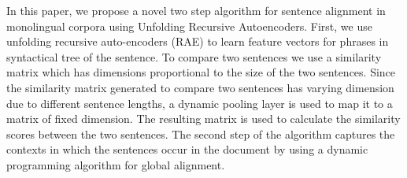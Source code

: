 In this paper, we propose a novel two step algorithm for sentence alignment in monolingual corpora using Unfolding Recursive Autoencoders. First, we use unfolding recursive auto-encoders (RAE) to learn feature vectors for phrases in syntactical tree of the sentence. To compare two sentences we use a similarity matrix which has dimensions proportional to the size of the two sentences. Since the similarity matrix generated to compare two sentences has varying dimension due to different sentence lengths, a dynamic pooling layer is used to map it to a matrix of fixed dimension. The resulting matrix is used to calculate the similarity scores between the two sentences. The second step of the algorithm captures the contexts in which the sentences occur in the document by using a dynamic programming algorithm for global alignment.
